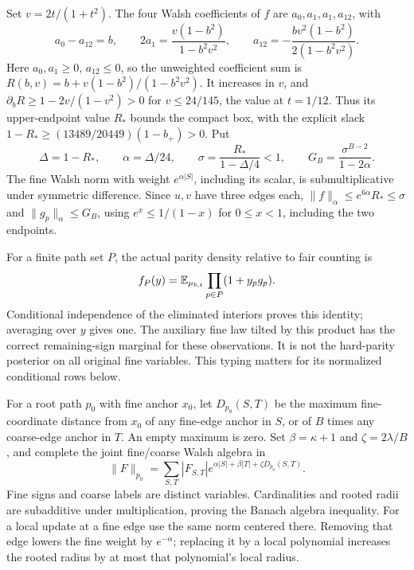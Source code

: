 Set \(v=2t/(1+t^2)\). The four Walsh coefficients of \(f\) are
\(a_0,a_1,a_1,a_{12}\), with
\begin{equation}
 a_0-a_{12}=b,\qquad
 2a_1=\frac{v(1-b^2)}{1-b^2v^2},\qquad
 a_{12}=-\frac{bv^2(1-b^2)}{2(1-b^2v^2)}.
 \label{eq:rg-spatial-proof-strip-coefficients}
\end{equation}
Here \(a_0,a_1\ge0\), \(a_{12}\le0\), so the unweighted coefficient
sum is \(R(b,v)=b+v(1-b^2)/(1-b^2v^2)\). It increases in \(v\), and
\(\partial_bR\ge1-2v/(1-v^2)>0\) for
\(v\le24/145\), the value at \(t=1/12\). Thus its upper-endpoint value
\(R_*\) bounds the compact box, with the explicit slack
\(1-R_*\ge(13489/20449)(1-b_+)>0\). Put
\begin{equation}
 \Delta=1-R_*,\qquad \alpha=\Delta/24,\qquad
 \sigma=\frac{R_*}{1-\Delta/4}<1,\qquad
 G_B=\frac{\sigma^{B-2}}{1-2\alpha}.
 \label{eq:rg-spatial-proof-basin-activity}
\end{equation}
The fine Walsh norm with weight \(e^{\alpha|S|}\), including its scalar,
is submultiplicative under symmetric difference. Since \(u,v\) have
three edges each,
\(\|f\|_\alpha\le e^{6\alpha}R_*\le\sigma\) and
\(\|g_p\|_\alpha\le G_B\), using
\(e^x\le1/(1-x)\) for \(0\le x<1\), including the two endpoints.

For a finite path set \(P\), the actual parity density relative to fair
counting is
\begin{equation}
 f_P(y)=\mathbb E_{\mu_{b,t}}\prod_{p\in P}(1+y_pg_p).
 \label{eq:rg-spatial-proof-soft-parity-density}
\end{equation}
Conditional independence of the eliminated interiors proves this identity;
averaging over \(y\) gives one. The auxiliary fine law tilted by this
product has the correct remaining-sign marginal for these observations.
It is not the hard-parity posterior on all original fine variables. This
typing matters for its normalized conditional rows below.

For a root path \(p_0\) with fine anchor \(x_0\), let
\(D_{p_0}(S,T)\) be the maximum fine-coordinate distance from \(x_0\)
of any fine-edge anchor in \(S\), or of \(B\) times any coarse-edge
anchor in \(T\). An empty maximum is zero. Set \(\beta=\kappa+1\) and
\(\zeta=2\lambda/B\), and complete the joint fine/coarse Walsh algebra
in
\begin{equation}
 \|F\|_{p_0}=\sum_{S,T}|F_{S,T}|
     e^{\alpha|S|+\beta|T|+\zeta D_{p_0}(S,T)}.
 \label{eq:rg-spatial-proof-rooted-algebra}
\end{equation}
Fine signs and coarse labels are distinct variables. Cardinalities and
rooted radii are subadditive under multiplication, proving the Banach
algebra inequality. For a local update at a fine edge use the same norm
centered there. Removing that edge lowers the fine weight by
\(e^{-\alpha}\); replacing it by a local polynomial increases the rooted
radius by at most that polynomial's local radius.

